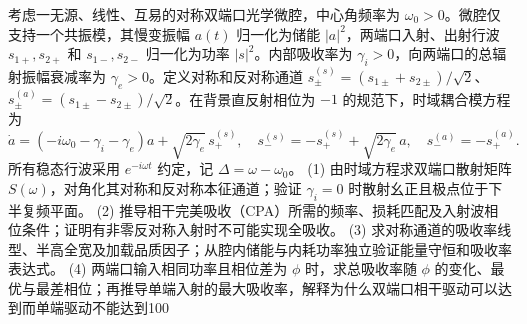 考虑一无源、线性、互易的对称双端口光学微腔，中心角频率为 \(\omega_0>0\)。微腔仅支持一个共振模，其慢变振幅 \(a(t)\) 归一化为储能 \(|a|^2\)，两端口入射、出射行波 \(s_{1+},s_{2+}\) 和 \(s_{1-},s_{2-}\) 归一化为功率 \(|s|^2\)。内部吸收率为 \(\gamma_i>0\)，向两端口的总辐射振幅衰减率为 \(\gamma_e>0\)。定义对称和反对称通道 \(s_{\pm}^{(s)}=(s_{1\pm}+s_{2\pm})/\sqrt2\)、\(s_{\pm}^{(a)}=(s_{1\pm}-s_{2\pm})/\sqrt2\)。在背景直反射相位为 \(-1\) 的规范下，时域耦合模方程为
\[
 \dot a=(-i\omega_0-\gamma_i-\gamma_e)a+\sqrt{2\gamma_e}\,s_+^{(s)},\quad
 s_-^{(s)}=-s_+^{(s)}+\sqrt{2\gamma_e}\,a,\quad
 s_-^{(a)}=-s_+^{(a)}.
\]
所有稳态行波采用 \(e^{-i\omega t}\) 约定，记 \(\Delta=\omega-\omega_0\)。
(1) 由时域方程求双端口散射矩阵 \(S(\omega)\)，对角化其对称和反对称本征通道；验证 \(\gamma_i=0\) 时散射幺正且极点位于下半复频平面。
(2) 推导相干完美吸收（CPA）所需的频率、损耗匹配及入射波相位条件；证明有非零反对称入射时不可能实现全吸收。
(3) 求对称通道的吸收率线型、半高全宽及加载品质因子；从腔内储能与内耗功率独立验证能量守恒和吸收率表达式。
(4) 两端口输入相同功率且相位差为 \(\phi\) 时，求总吸收率随 \(\phi\) 的变化、最优与最差相位；再推导单端入射的最大吸收率，解释为什么双端口相干驱动可以达到而单端驱动不能达到100%
